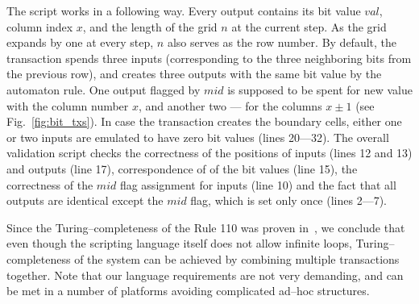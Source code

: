 \documentclass[runningheads]{llncs}
\begin{document}
    The script works in a following way. Every output contains its bit value $val$,
    column index $x$, and the length of the grid $n$ at the current step. As the
    grid expands by one at every step, $n$ also serves as the row number. By
    default, the transaction spends three inputs (corresponding to the three
    neighboring bits from the previous row), and creates three outputs with the same
    bit value by the automaton rule. One output flagged by $mid$ is supposed to be
    spent for new value with the column number $x$, and another two --- for the
    columns $x\pm 1$ (see Fig.~\ref{fig:bit_txs}). In case the transaction creates the
    boundary cells, either one or two inputs are emulated to have zero bit values
    (lines 20---32).  The overall validation script checks the correctness of the
    positions of inputs (lines 12 and 13) and outputs (line 17), correspondence of
    of the bit values (line 15), the correctness of the $mid$  flag assignment for
    inputs (line 10) and the fact that all outputs are identical except the $mid$
    flag, which is set only once (lines 2---7).

    Since the Turing--completeness of the Rule 110 was proven
    in~\cite{cook2004universality}, we conclude that even though the scripting
    language itself does not allow infinite loops, Turing--completeness of the
    system can be achieved by combining multiple transactions together. Note
    that our language requirements are not very demanding, and can be met in a
    number of platforms avoiding complicated ad--hoc structures.
\end{document}
